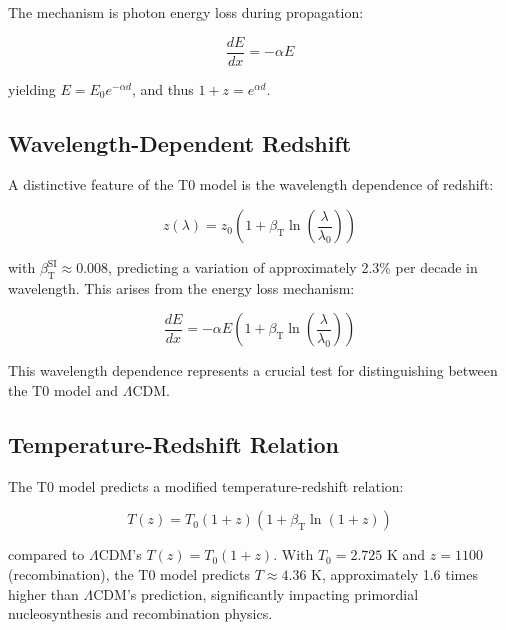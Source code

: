 \documentclass[aps,prl,twocolumn,superscriptaddress,nofootinbib]{revtex4-2}
\newcommand{\betaT}{\beta_{\text{T}}}
\newcommand{\LCDM}{\Lambda\text{CDM}}
\begin{document}
	The mechanism is photon energy loss during propagation:
	
	\begin{equation}
		\frac{dE}{dx} = -\alpha E
		\label{eq:energy_loss_rate}
	\end{equation}
	
	yielding $E = E_0 e^{-\alpha d}$, and thus $1 + z = e^{\alpha d}$.
	
	\subsection{Wavelength-Dependent Redshift}
	\label{subsec:wavelength_redshift}
	
	A distinctive feature of the T0 model is the wavelength dependence of redshift:
	
	\begin{equation}
		z(\lambda) = z_0 \left(1 + \betaT \ln\left(\frac{\lambda}{\lambda_0}\right)\right)
		\label{eq:wavelength_redshift}
	\end{equation}
	
	with $\betaT^{\text{SI}} \approx 0.008$, predicting a variation of approximately 2.3\% per decade in wavelength. This arises from the energy loss mechanism:
	
	\begin{equation}
		\frac{dE}{dx} = -\alpha E \left(1 + \betaT \ln\left(\frac{\lambda}{\lambda_0}\right)\right)
		\label{eq:wavelength_energy_loss}
	\end{equation}
	
	This wavelength dependence represents a crucial test for distinguishing between the T0 model and $\LCDM$.
	
	\subsection{Temperature-Redshift Relation}
	\label{subsec:temperature_redshift}
	
	The T0 model predicts a modified temperature-redshift relation:
	
	\begin{equation}
		T(z) = T_0 (1 + z) (1 + \betaT \ln(1 + z))
		\label{eq:temperature_redshift}
	\end{equation}
	
	compared to $\LCDM$'s $T(z) = T_0 (1 + z)$. With $T_0 = 2.725$ K and $z = 1100$ (recombination), the T0 model predicts $T \approx 4.36$ K, approximately 1.6 times higher than $\LCDM$'s prediction, significantly impacting primordial nucleosynthesis and recombination physics.
	
\end{document}
